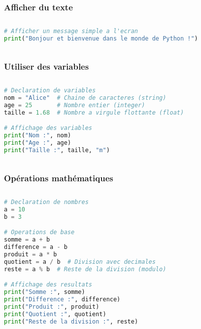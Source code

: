 \documentclass[aspectratio=169,xcolor=dvipsnames]{beamer}
\begin{document}
\begin{frame}[fragile]
\frametitle{Afficher du texte}
    \begin{columns}[c] %

        \begin{lstlisting}[language=Python]
# Afficher un message simple a l'ecran
print("Bonjour et bienvenue dans le monde de Python !")
        \end{lstlisting}

    \end{columns}
\end{frame}

\begin{frame}[fragile]
\frametitle{Utiliser des variables}
    \begin{columns}[c] %

        \begin{lstlisting}[language=Python]
# Declaration de variables
nom = "Alice"  # Chaine de caracteres (string)
age = 25       # Nombre entier (integer)
taille = 1.68  # Nombre a virgule flottante (float)

# Affichage des variables
print("Nom :", nom)
print("Age :", age)
print("Taille :", taille, "m")
        \end{lstlisting}

    \end{columns}
\end{frame}

\begin{frame}[fragile]
\frametitle{Opérations mathématiques}
    \begin{columns}[c] %

        \begin{lstlisting}[language=Python]
# Declaration de nombres
a = 10
b = 3

# Operations de base
somme = a + b
difference = a - b
produit = a * b
quotient = a / b  # Division avec decimales
reste = a % b  # Reste de la division (modulo)

# Affichage des resultats
print("Somme :", somme)
print("Difference :", difference)
print("Produit :", produit)
print("Quotient :", quotient)
print("Reste de la division :", reste)
        \end{lstlisting}

    \end{columns}
\end{frame}
\end{document}
